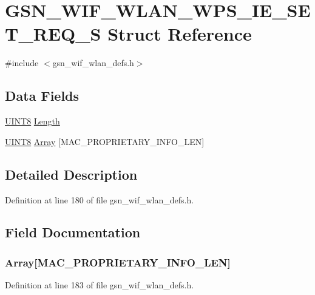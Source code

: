 \hypertarget{a00415}{
\section{GSN\_\-WIF\_\-WLAN\_\-WPS\_\-IE\_\-SET\_\-REQ\_\-S Struct Reference}
\label{a00415}
}


{\ttfamily \#include $<$gsn\_\-wif\_\-wlan\_\-defs.h$>$}

\subsection*{Data Fields}
\begin{DoxyCompactItemize}
\item 
\hyperlink{a00660_gab27e9918b538ce9d8ca692479b375b6a}{UINT8} \hyperlink{a00415_a92c9c711d62ad0b99ad1f6c2a94f7bc2}{Length}
\item 
\hyperlink{a00660_gab27e9918b538ce9d8ca692479b375b6a}{UINT8} \hyperlink{a00415_ab8ab2532d0e03ac532b60d36254469a1}{Array} \mbox{[}MAC\_\-PROPRIETARY\_\-INFO\_\-LEN\mbox{]}
\end{DoxyCompactItemize}


\subsection{Detailed Description}


Definition at line 180 of file gsn\_\-wif\_\-wlan\_\-defs.h.



\subsection{Field Documentation}
\hypertarget{a00415_ab8ab2532d0e03ac532b60d36254469a1}{
\subsubsection[{Array}]{ {\bf Array}\mbox{[}MAC\_\-PROPRIETARY\_\-INFO\_\-LEN\mbox{]}}}
\label{a00415_ab8ab2532d0e03ac532b60d36254469a1}


Definition at line 183 of file gsn\_\-wif\_\-wlan\_\-defs.h.

